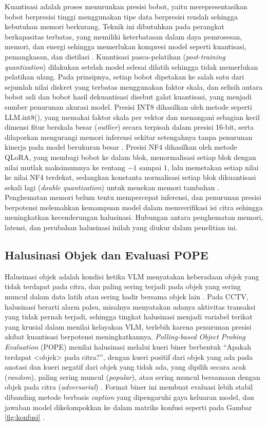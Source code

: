 Kuantisasi adalah proses menurunkan presisi bobot, yaitu merepresentasikan bobot berpresisi tinggi menggunakan tipe data berpresisi rendah sehingga kebutuhan memori berkurang. Teknik ini dibutuhkan pada perangkat berkapasitas terbatas, yang memiliki keterbatasan dalam daya pemrosesan, memori, dan energi sehingga memerlukan kompresi model seperti kuantisasi, pemangkasan, dan distilasi \cite{ref14}. Kuantisasi pasca-pelatihan (\textit{post-training quantization}) dilakukan setelah model selesai dilatih sehingga tidak memerlukan pelatihan ulang. Pada prinsipnya, setiap bobot dipetakan ke salah satu dari sejumlah nilai diskret yang terbatas menggunakan faktor skala, dan selisih antara bobot asli dan bobot hasil dekuantisasi disebut galat kuantisasi, yang menjadi sumber penurunan akurasi model. Presisi INT8 dihasilkan oleh metode seperti LLM.int8(), yang memakai faktor skala per vektor dan menangani sebagian kecil dimensi fitur berskala besar (\textit{outlier}) secara terpisah dalam presisi 16-bit, serta dilaporkan mengurangi memori inferensi sekitar setengahnya tanpa penurunan kinerja pada model berukuran besar \cite{ref34}. Presisi NF4 dihasilkan oleh metode QLoRA, yang membagi bobot ke dalam blok, menormalisasi setiap blok dengan nilai mutlak maksimumnya ke rentang $-1$ sampai $1$, lalu memetakan setiap nilai ke nilai NF4 terdekat, sedangkan konstanta normalisasi setiap blok dikuantisasi sekali lagi (\textit{double quantization}) untuk menekan memori tambahan \cite{ref35}. Penghematan memori belum tentu mempercepat inferensi, dan penurunan presisi berpotensi melemahkan kemampuan model dalam memverifikasi isi citra sehingga meningkatkan kecenderungan halusinasi. Hubungan antara penghematan memori, latensi, dan perubahan halusinasi inilah yang diukur dalam penelitian ini.

\subsection{Halusinasi Objek dan Evaluasi POPE}
Halusinasi objek adalah kondisi ketika VLM menyatakan keberadaan objek yang tidak terdapat pada citra, dan paling sering terjadi pada objek yang sering muncul dalam data latih atau sering hadir bersama objek lain \cite{ref9}. Pada CCTV, halusinasi berarti alarm palsu, misalnya menyatakan adanya aktivitas transaksi yang tidak pernah terjadi, sehingga tingkat halusinasi menjadi variabel terikat yang krusial dalam menilai kelayakan VLM, terlebih karena penurunan presisi akibat kuantisasi berpotensi meningkatkannya. \textit{Polling-based Object Probing Evaluation} (POPE) menilai halusinasi melalui kueri biner berbentuk ``Apakah terdapat \textless objek\textgreater{} pada citra?'', dengan kueri positif dari objek yang ada pada anotasi dan kueri negatif dari objek yang tidak ada, yang dipilih secara acak (\textit{random}), paling sering muncul (\textit{popular}), atau sering muncul bersamaan dengan objek pada citra (\textit{adversarial}) \cite{ref9}. Format biner ini membuat evaluasi lebih stabil dibanding metode berbasis \textit{caption} yang dipengaruhi gaya keluaran model, dan jawaban model dikelompokkan ke dalam matriks konfusi seperti pada Gambar \ref{fig:konfusi} \cite{ref9}.

